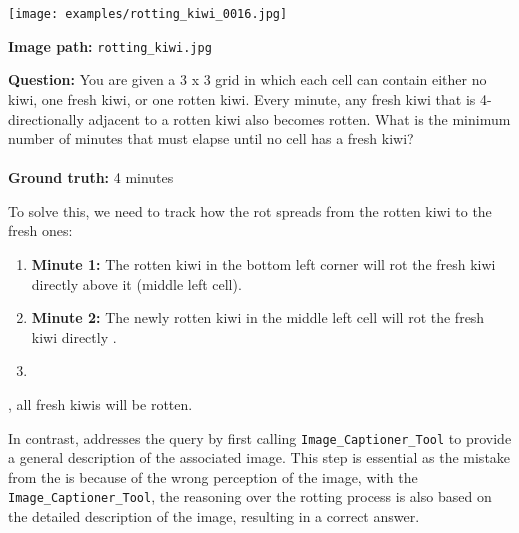 
\begin{querybox}
\begin{minipage}{0.3\linewidth}
    \texttt{[image: examples/rotting\_kiwi\_0016.jpg]}
\end{minipage}
\hspace{5pt}
\begin{minipage}{0.55\linewidth}
    \textbf{Image path:} \texttt{rotting\_kiwi.jpg}
    
    \textbf{Question:} You are given a 3 x 3 grid in which each cell can contain either no kiwi, one fresh kiwi, or one rotten kiwi. Every minute, any fresh kiwi that is 4-directionally adjacent to a rotten kiwi also becomes rotten. What is the minimum number of minutes that must elapse until no cell has a fresh kiwi?
    \\\\
    \textbf{Ground truth:} 4 minutes
\end{minipage}
\end{querybox}


\begin{querybox}
To solve this, we need to track how the rot spreads from the rotten kiwi to the fresh ones:

\begin{enumerate}
    \item \textbf{Minute 1:} The rotten kiwi in the bottom left corner will rot the fresh kiwi directly above it (middle left cell).

    \item \textbf{Minute 2:} The newly rotten kiwi in the middle left cell will rot the fresh kiwi directly .

    \item {}
\end{enumerate}

, all fresh kiwis will be rotten.
\end{querybox}

In contrast, \model addresses the query by first calling \texttt{Image\_Captioner\_Tool} to provide a general description of the associated image. This step is essential as the mistake from the \gpt is because of the wrong perception of the image, with the \texttt{Image\_Captioner\_Tool}, the reasoning over the rotting process is also based on the detailed description of the image, resulting in a correct answer.

